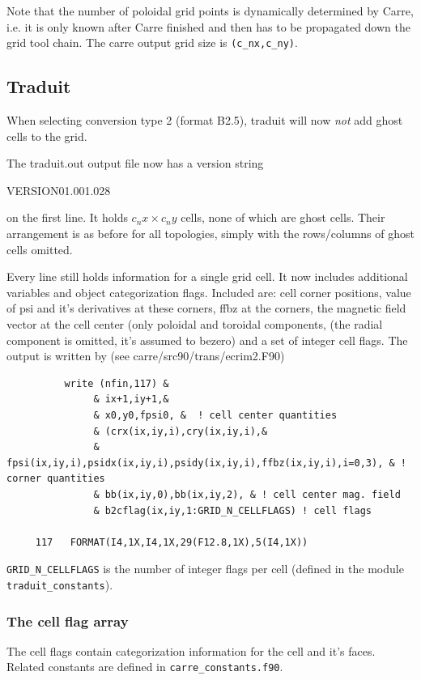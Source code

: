 \documentclass[10pt,a4paper]{report}
\begin{document}
Note that the number of poloidal grid points is dynamically determined by Carre, i.e. it is only known after Carre finished and then has to be propagated down the grid tool chain. The carre output grid size is \verb+(c_nx,c_ny)+.

\subsection{Traduit}
When selecting conversion type 2 (format B2.5), traduit will now \emph{not} add ghost cells to the grid. 

The traduit.out output file now has a version string

VERSION01.001.028

on the first line. It holds $c_nx \times c_ny$ cells, none of which are ghost cells. Their arrangement is as before for all topologies, simply with the rows/columns of ghost cells omitted.

Every line still holds information for a single grid cell. It now includes additional variables and object categorization flags.
Included are: cell corner positions, value of psi and it's derivatives at these corners, ffbz at the corners, 
the magnetic field vector at the cell center (only poloidal and toroidal components,
(the radial component is omitted, it's assumed to bezero) and a set of integer cell flags.
The output is written by (see carre/src90/trans/ecrim2.F90)

\begin{verbatim}
          write (nfin,117) &
               & ix+1,iy+1,&
               & x0,y0,fpsi0, &  ! cell center quantities
               & (crx(ix,iy,i),cry(ix,iy,i),&
               &  fpsi(ix,iy,i),psidx(ix,iy,i),psidy(ix,iy,i),ffbz(ix,iy,i),i=0,3), & ! corner quantities
               & bb(ix,iy,0),bb(ix,iy,2), & ! cell center mag. field
               & b2cflag(ix,iy,1:GRID_N_CELLFLAGS) ! cell flags
          
     117   FORMAT(I4,1X,I4,1X,29(F12.8,1X),5(I4,1X))
\end{verbatim}

\verb+GRID_N_CELLFLAGS+ is the number of integer flags per cell (defined in the module \verb+traduit_constants+).

\subsubsection{The cell flag array}

The cell flags contain categorization information for the cell and it's faces.
Related constants are defined in \verb-carre_constants.f90-.
\end{document}
